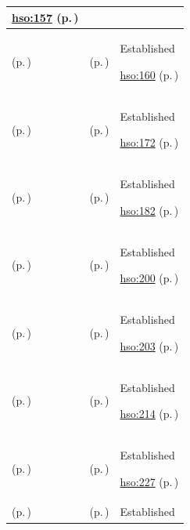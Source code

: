 \begin{longtable}{|>{\raggedright\arraybackslash}p{0.27\TableWidth}|>{\raggedright\arraybackslash}p{0.27\TableWidth}|>{\raggedright\arraybackslash}p{0.46\TableWidth}|}
 \hyperref[rad:hso:151]{hso:157} (p.\,\pageref{rad:hso:151})\\\hline
\nameref{function:manage-bed-turnover-progression} (p.\,\pageref{function:manage-bed-turnover-progression}) & \nameref{feature:feat-hso-12} (p.\,\pageref{feature:feat-hso-12}) & Established

 \hyperref[rad:hso:151]{hso:160} (p.\,\pageref{rad:hso:151})\\\hline
\nameref{function:track-mobile-clinical-asset-operational-state} (p.\,\pageref{function:track-mobile-clinical-asset-operational-state}) & \nameref{feature:feat-hso-14} (p.\,\pageref{feature:feat-hso-14}) & Established

 \hyperref[rad:hso:169]{hso:172} (p.\,\pageref{rad:hso:169})\\\hline
\nameref{function:aggregate-service-capacity-telemetry} (p.\,\pageref{function:aggregate-service-capacity-telemetry}) & \nameref{feature:feat-hso-15} (p.\,\pageref{feature:feat-hso-15}) & Established

 \hyperref[rad:hso:179]{hso:182} (p.\,\pageref{rad:hso:179})\\\hline
\nameref{function:receive-mobile-visit-progression} (p.\,\pageref{function:receive-mobile-visit-progression}) & \nameref{feature:feat-hso-17} (p.\,\pageref{feature:feat-hso-17}) & Established

 \hyperref[rad:hso:190]{hso:200} (p.\,\pageref{rad:hso:190})\\\hline
\nameref{function:integrate-mobile-work-management} (p.\,\pageref{function:integrate-mobile-work-management}) & \nameref{feature:feat-hso-16} (p.\,\pageref{feature:feat-hso-16}) & Established

 \hyperref[rad:hso:190]{hso:203} (p.\,\pageref{rad:hso:190})\\\hline
\nameref{function:resolve-active-on-call-coverage} (p.\,\pageref{function:resolve-active-on-call-coverage}) & \nameref{feature:feat-hso-18} (p.\,\pageref{feature:feat-hso-18}) & Established

 \hyperref[rad:hso:211]{hso:214} (p.\,\pageref{rad:hso:211})\\\hline
\nameref{function:dispatch-operational-work-order} (p.\,\pageref{function:dispatch-operational-work-order}) & \nameref{feature:feat-hso-19} (p.\,\pageref{feature:feat-hso-19}) & Established

 \hyperref[rad:hso:221]{hso:227} (p.\,\pageref{rad:hso:221})\\\hline
\nameref{function:manage-operational-work-progression} (p.\,\pageref{function:manage-operational-work-progression}) & \nameref{feature:feat-hso-22} (p.\,\pageref{feature:feat-hso-22}) & Established


\end{longtable}
